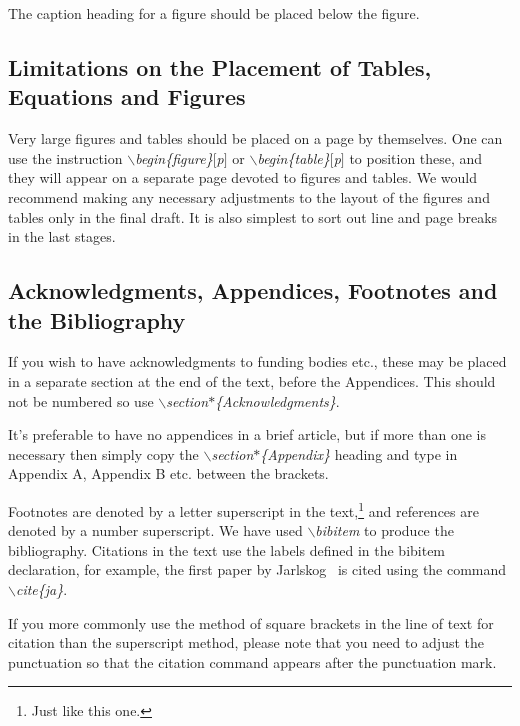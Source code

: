 \documentclass[11pt]{article}
\begin{document}
The caption heading for a figure should be placed below the figure.

\subsection{Limitations on the Placement of Tables,
Equations and Figures}\label{sec:plac}

Very large figures and tables should be placed on a page by themselves. One
can use the instruction {\em $\backslash$begin\{figure\}$[$p$]$} or
{\em $\backslash$begin\{table\}$[$p$]$}
to position these, and they will appear on a separate page devoted to
figures and tables. We would recommend making any necessary
adjustments to the layout of the figures and tables
only in the final draft. It is also simplest to sort out line and
page breaks in the last stages.

\subsection{Acknowledgments, Appendices, Footnotes and the Bibliography}
If you wish to have
acknowledgments to funding bodies etc., these may be placed in a separate
section at the end of the text, before the Appendices. This should not
be numbered so use {\em $\backslash$section$\ast$\{Acknowledgments\}}.

It's preferable to have no appendices in a brief article, but if more
than one is necessary then simply copy the
{\em $\backslash$section$\ast$\{Appendix\}}
heading and type in Appendix A, Appendix B etc. between the brackets.

Footnotes are denoted by a letter superscript
in the text,\footnote{Just like this one.} and references
are denoted by a number superscript.
We have used {\em $\backslash$bibitem} to produce the bibliography.
Citations in the text use the labels defined in the bibitem declaration,
for example, the first paper by Jarlskog~\cite{ja} is cited using the command
{\em $\backslash$cite\{ja\}}.

If you more commonly use the method of square brackets in the line of text
for citation than the superscript method,
please note that you need  to adjust the punctuation
so that the citation command appears after the punctuation mark.
\end{document}
